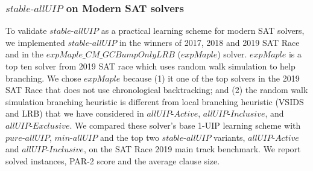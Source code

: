 \documentclass[runningheads]{llncs}
\newcommand{\allUip}{\textit{stable-allUIP}}
\newcommand{\allUipPure}{\textit{pure-allUIP}\xspace}
\newcommand{\allUipMin}{\textit{min-allUIP}\xspace}
\newcommand{\allUipAct}{\textit{allUIP-Active}}
\newcommand{\allUipIn}{\textit{allUIP-Inclusive}}
\newcommand{\allUipEx}{\textit{allUIP-Exclusive}}
\newcommand{\expSAT}{\textit{expMaple\_CM\_GCBumpOnlyLRB} }
\newcommand{\expSATShort}{\textit{expMaple} }
\begin{document}


\subsubsection{$\allUip$ on Modern SAT solvers}
To validate $\allUip$ as a practical learning scheme for modern SAT
solvers, we implemented $\allUip$ in the winners of 2017, 2018 and
2019 SAT
Race\cite{luo2017effective,ryvchin2018maple,Stepan2019MapleLCMDistChronoBT}
and in the $\expSAT$\cite{MdSolimul2019expMalpe} ($\expSATShort$)
solver. $\expSATShort$ is a top ten solver from 2019 SAT race which
uses random walk simulation to help branching. We chose $\expSATShort$
because (1) it one of the top solvers in the 2019 SAT Race that does
not use chronological backtracking; and (2) the random walk simulation
branching heuristic is different from local branching heuristic (VSIDS
and LRB) that we have considered in $\allUipAct$, $\allUipIn$, and
$\allUipEx$. We compared these solver's base 1-UIP learning scheme
with $\allUipPure$, $\allUipMin$ and the top two $\allUip$ variants,
$\allUipAct$ and $\allUipIn$, on the SAT Race 2019 main track
benchmark. We report solved instances, PAR-2 score and the average
clause size.
\end{document}
